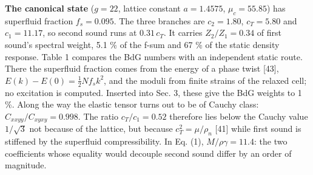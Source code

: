 \documentclass[
  11pt,
]{article}
\begin{document}
\textbf{The canonical state} (\(g=22\), lattice constant \(a=1.4575\),
\(\mu_c=55.85\)) has superfluid fraction \(f_s=0.095\). The three
branches are \(c_2=1.80\), \(c_T=5.80\) and \(c_1=11.17\), so second
sound runs at \(0.31\,c_T\). It carries \(Z_2/Z_1=0.34\) of first
sound's spectral weight, 5.1 \% of the f-sum and 67 \% of the static
density response. Table 1 compares the BdG numbers with an independent
static route. There the superfluid fraction comes from the energy of a
phase twist {[}43{]}, \(E(k)-E(0)=\tfrac12Nf_sk^2\), and the moduli from
finite strains of the relaxed cell; no excitation is computed. Inserted
into Sec. 3, these give the BdG weights to 1 \%. Along the way the
elastic tensor turns out to be of Cauchy class:
\(C_{xxyy}/C_{xyxy}=0.998\). The ratio \(c_T/c_1=0.52\) therefore lies
below the Cauchy value \(1/\sqrt3\) not because of the lattice, but
because \(c_T^2=\mu/\rho_n\) {[}41{]} while first sound is stiffened by
the superfluid compressibility. In Eq. (1), \(M/\rho\gamma=11.4\): the
two coefficients whose equality would decouple second sound differ by an
order of magnitude.
\end{document}
